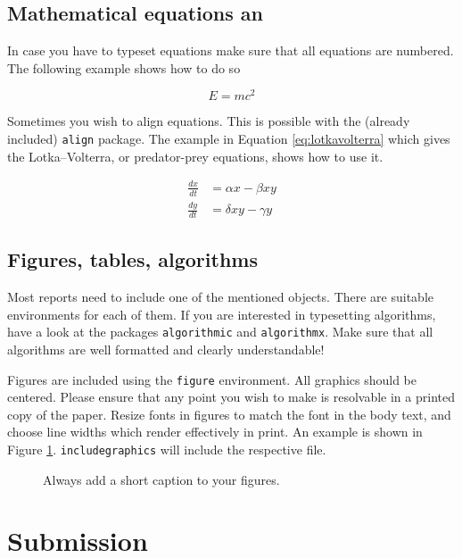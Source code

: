 \documentclass[10pt,a4paper,twoside,journal]{IEEEtran}
\begin{document}
\subsection{Mathematical equations an}

In case you have to typeset equations make sure that all equations are numbered.
The following example shows how to do so

\begin{equation}
	E = mc^2
\end{equation}

Sometimes you wish to align equations. This is possible with the (already
included) \texttt{align} package. The example in Equation \ref{eq:lotkavolterra}
which gives the Lotka--Volterra, or predator-prey equations, shows how to use
it.

\begin{align}\label{eq:lotkavolterra}
	\frac{dx}{dt} &= \alpha x - \beta x y \\
	\frac{dy}{dt} &= \delta x y - \gamma y
\end{align}

\subsection{Figures, tables, algorithms}

Most reports need to include one of the mentioned objects. There are suitable
environments for each of them. If you are interested in typesetting algorithms,
have a look at the packages \texttt{algorithmic} and \texttt{algorithmx}. Make
sure that all algorithms are well formatted and clearly understandable!

Figures are included using the \texttt{figure} environment. All graphics should
be centered.  Please ensure that any point you wish to make is resolvable in a
printed copy of the paper. Resize fonts in figures to match the font in the
body text, and choose line widths which render effectively in print. An example
is shown in Figure \ref{fig:onecolumnfigure}.
\texttt{includegraphics} will include the respective file.
\begin{figure}
	\centering
	\fbox{\rule{0pt}{2cm} \rule{1.0\linewidth}{0pt}}
	\caption{Always add a short caption to your figures.}
	\label{fig:onecolumnfigure}
\end{figure}


\section{Submission}
\end{document}
